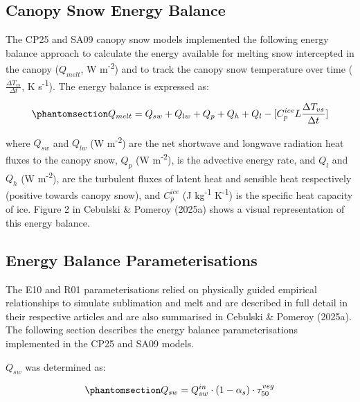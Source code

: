 \documentclass[
  letterpaper,
]{tex/uofsthesis-cs}
\begin{document}
\subsection{Canopy Snow Energy Balance}\label{sec-ebal}

The CP25 and SA09 canopy snow models implemented the following energy
balance approach to calculate the energy available for melting snow
intercepted in the canopy (\(Q_{melt}\), W m\textsuperscript{-2}) and to
track the canopy snow temperature over time
(\(\frac{\Delta T_{vs}}{\Delta t}\), K s\textsuperscript{-1}). The
energy balance is expressed as:

\begin{equation}\phantomsection\label{eq-eb}{
Q_{melt} = 
Q_{sw} +
Q_{lw} +
Q_{p} + Q_{h} + Q_{l} - [C_p^{ice} L \frac{\Delta T_{vs}}{\Delta t}]
}\end{equation}

where \(Q_{sw}\) and \(Q_{lw}\) (W m\textsuperscript{-2}) are the net
shortwave and longwave radiation heat fluxes to the canopy snow, \(Q_p\)
(W m\textsuperscript{-2}), is the advective energy rate, and \(Q_{l}\)
and \(Q_{h}\) (W m\textsuperscript{-2}), are the turbulent fluxes of
latent heat and sensible heat respectively (positive towards canopy
snow), and \(C_p^{ice}\) (J kg\textsuperscript{-1}
K\textsuperscript{-1}) is the specific heat capacity of ice. Figure 2 in
Cebulski \& Pomeroy (2025a) shows a visual representation of this energy
balance.

\subsection{Energy Balance
Parameterisations}\label{energy-balance-parameterisations}

The E10 and R01 parameterisations relied on physically guided empirical
relationships to simulate sublimation and melt and are described in full
detail in their respective articles and are also summarised in Cebulski
\& Pomeroy (2025a). The following section describes the energy balance
parameterisations implemented in the CP25 and SA09 models.

\(Q_{sw}\) was determined as:

\begin{equation}\phantomsection\label{eq-sw}{
Q_{sw} = Q_{sw}^{in} \cdot (1 - \alpha_s) \cdot \tau_{50}^{veg}
}\end{equation}
\end{document}
